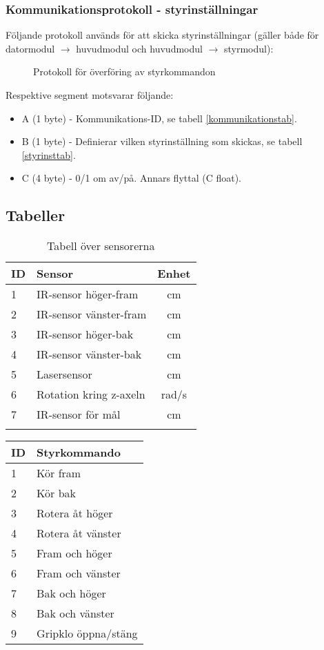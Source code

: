 \documentclass[11pt]{article}
\begin{document}
\begin{flushleft}
\subsubsection{Kommunikationsprotokoll - styrinställningar}
Följande protokoll används för att skicka styrinställningar (gäller både för datormodul $\rightarrow$ huvudmodul och huvudmodul $\rightarrow$ styrmodul):

\begin{figure}[htbp]
\centering
\noindent\resizebox{.8\linewidth}{!}{
	}
	\caption{Protokoll för överföring av styrkommandon\label{styrdata}}	
\end{figure}

Respektive segment motsvarar följande: 
\begin{itemize}
	\item A (1 byte) - Kommunikations-ID, se tabell \ref{kommunikationstab}.
	\item B (1 byte) - Definierar vilken styrinställning som skickas, se tabell \ref{styrinsttab}.
	\item C (4 byte) - 0/1 om av/på. Annars flyttal (C float).
\end{itemize}

\subsection{Tabeller}

\begin{longtable}[l]{| l | l | c |} \hline
\textbf{ID} & \textbf{Sensor} & \textbf{Enhet} \\ \hline 
1 & IR-sensor höger-fram & cm \\ \hline
2 & IR-sensor vänster-fram  & cm \\ \hline
3 & IR-sensor höger-bak  & cm  \\ \hline
4 & IR-sensor vänster-bak  &  cm \\ \hline
5 & Lasersensor & cm  \\ \hline
6 & Rotation kring z-axeln & rad/s \\ \hline
7 & IR-sensor för mål & cm \\ \hline
\caption{Tabell över sensorerna}\label{sensortab}
\end{longtable}

\begin{longtable}[l]{| l | l |} \hline
\textbf{ID} & \textbf{Styrkommando} \\ \hline 
1 & Kör fram \\ \hline
2 & Kör bak \\ \hline
3 & Rotera åt höger \\ \hline
4 & Rotera åt vänster \\ \hline
5 & Fram och höger \\ \hline
6 & Fram och vänster \\ \hline
7 & Bak och höger \\ \hline
8 & Bak och vänster \\ \hline
9 & Gripklo öppna/stäng \\ \hline


\end{longtable}
\end{flushleft}
\end{document}
